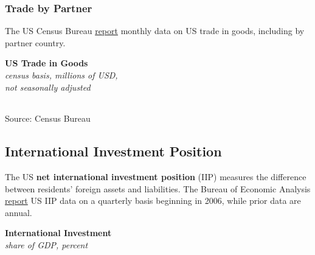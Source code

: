 \documentclass{report}
\begin{document}
{\begin{minipage}{0.76\textwidth}
\subsubsection*{Trade by Partner} 
\small The US Census Bureau \href{https://www.census.gov/foreign-trade/data/index.html}{report} monthly data on US trade in goods, including by partner country.  
\vspace{2mm}

\normalsize \textbf{US Trade in Goods} \hspace{12mm}  \hspace{22mm} \\
\footnotesize{\textit{census basis, millions of USD,}}\\
\footnotesize{\textit{not seasonally adjusted}}\\
 \setlength{\tabcolsep}{3.0pt} \color{black!90}
	{\renewcommand{\arraystretch}{1.54}
		\begin{tabular}{p{30mm} R{12mm} R{12mm} R{12mm} R{15mm} R{12mm} R{12mm}}
			  \hline
		\end{tabular}}
	\vspace{-2mm}		
	
\footnotesize{Source: Census Bureau}
\end{minipage}
\newpage
\hypertarget{exiip}{\label{exiip}}
\begin{minipage}{0.76\textwidth}
\subsection*{International Investment Position}
\vspace{-0.5mm}
\small The US \textbf{net international investment position} (IIP) measures the difference between residents' foreign assets and liabilities. The Bureau of Economic Analysis \href{https://www.bea.gov/data/intl-trade-investment/international-investment-position}{report} US IIP data on a quarterly basis beginning in 2006, while prior data are annual. 


\vspace{1mm}

\normalsize \textbf{International Investment}\\
\footnotesize{\textit{share of GDP, percent}}
\vspace*{-12mm}


\end{minipage}}
\end{document}

